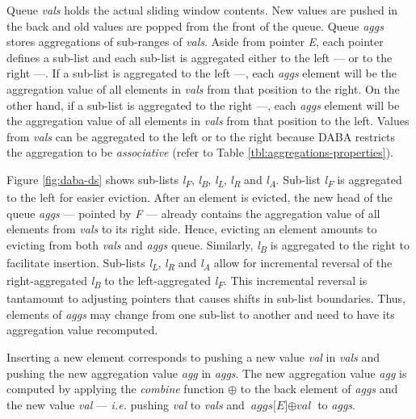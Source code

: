 Queue \textit{vals} holds the actual sliding window contents. New values are pushed in the back and old values are popped from the front of the queue. Queue \textit{aggs} stores aggregations of sub-ranges of \textit{vals}. Aside from pointer \textit{E}, each pointer defines a sub-list and each sub-list is aggregated either to the left \textbullet--- or to the right ---\textbullet. If a sub-list is aggregated to the left \textbullet---, each \textit{aggs} element will be the aggregation value of all elements in \textit{vals} from that position to the right. On the other hand, if a sub-list is aggregated to the right ---\textbullet, each \textit{aggs} element will be the aggregation value of all elements in \textit{vals} from that position to the left. Values from \textit{vals} can be aggregated to the left or to the right because DABA restricts the aggregation to be \textit{associative} (refer to Table \ref{tbl:aggregations-properties}).

Figure \ref{fig:daba-ds} shows sub-lists \textit{l\textsubscript{F}}, \textit{l\textsubscript{B}}, \textit{l\textsubscript{L}}, \textit{l\textsubscript{R}} and \textit{l\textsubscript{A}}. Sub-list \textit{l\textsubscript{F}} is aggregated to the left for easier eviction. After an element is evicted, the new head of the queue \textit{aggs} --- pointed by \textit{F} --- already contains the aggregation value of all elements from \textit{vals} to its right side. Hence, evicting an element amounts to evicting from both \textit{vals} and \textit{aggs} queue. Similarly, \textit{l\textsubscript{B}} is aggregated to the right to facilitate insertion. Sub-lists \textit{l\textsubscript{L}}, \textit{l\textsubscript{R}} and \textit{l\textsubscript{A}} allow for incremental reversal of the right-aggregated \textit{l\textsubscript{B}} to the left-aggregated \textit{l\textsubscript{F}}. This incremental reversal is tantamount to adjusting pointers that causes shifts in sub-list boundaries. Thus, elements of \textit{aggs} may change from one sub-list to another and need to have its aggregation value recomputed.

Inserting a new element corresponds to pushing a new value \textit{val} in \textit{vals} and pushing the new aggregation value \textit{agg} in \textit{aggs}. The new aggregation value \textit{agg} is computed by applying the \textit{combine} function $\oplus$ to the back element of \textit{aggs} and the new value \textit{val} --- \textit{i.e.} pushing \textit{val} to \textit{vals} and $\textit{aggs[E]} \oplus \textit{val}$ to \textit{aggs}. 

